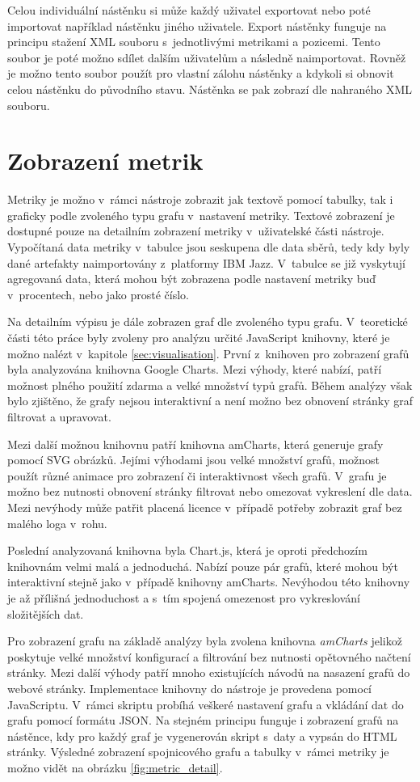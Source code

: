 \documentclass[czech,master]{diploma}
\begin{document}
Celou individuální nástěnku si může každý uživatel exportovat nebo poté importovat například nástěnku jiného uživatele. Export nástěnky funguje na principu stažení XML souboru s~jednotlivými metrikami a pozicemi. Tento soubor je poté možno sdílet dalším uživatelům a následně naimportovat. Rovněž je možno tento soubor použít pro vlastní zálohu nástěnky a kdykoli si obnovit celou nástěnku do původního stavu. Nástěnka se pak zobrazí dle nahraného XML souboru.


\section{Zobrazení metrik}
Metriky je možno v~rámci nástroje zobrazit jak textově pomocí tabulky, tak i graficky podle zvoleného typu grafu v~nastavení metriky. Textové zobrazení je dostupné pouze na detailním zobrazení metriky v~uživatelské části nástroje. Vypočítaná data metriky v~tabulce jsou seskupena dle data sběrů, tedy kdy byly dané artefakty naimportovány z~platformy IBM Jazz. V~tabulce se již vyskytují agregovaná data, která mohou být zobrazena podle nastavení metriky buď v~procentech, nebo jako prosté číslo.

Na detailním výpisu je dále zobrazen graf dle zvoleného typu grafu. V~teoretické části této práce byly zvoleny pro analýzu určité JavaScript knihovny, které je možno nalézt v~kapitole \ref{sec:visualisation}. První z~knihoven pro zobrazení grafů byla analyzována knihovna Google Charts. Mezi výhody, které nabízí, patří možnost plného použití zdarma a velké množství typů grafů. Během analýzy však bylo zjištěno, že grafy nejsou interaktivní a není možno bez obnovení stránky graf filtrovat a upravovat.

Mezi další možnou knihovnu patří knihovna amCharts, která generuje grafy pomocí SVG obrázků. Jejími výhodami jsou velké množství grafů, možnost použít různé animace pro zobrazení či interaktivnost všech grafů. V~grafu je možno bez nutnosti obnovení stránky filtrovat nebo omezovat vykreslení dle data. Mezi nevýhody může patřit placená licence v~případě potřeby zobrazit graf bez malého loga v~rohu.

Poslední analyzovaná knihovna byla Chart.js, která je oproti předchozím knihovnám velmi malá a jednoduchá. Nabízí pouze pár grafů, které mohou být interaktivní stejně jako v~případě knihovny amCharts. Nevýhodou této knihovny je až přílišná jednoduchost a s~tím spojená omezenost pro vykreslování složitějších dat.

Pro zobrazení grafu na základě analýzy byla zvolena knihovna \textit{amCharts} jelikož poskytuje velké množství konfigurací a filtrování bez nutnosti opětovného načtení stránky. Mezi další výhody patří mnoho existujících návodů na nasazení grafů do webové stránky. Implementace knihovny do nástroje je provedena pomocí JavaScriptu. V~rámci skriptu probíhá veškeré nastavení grafu a vkládání dat do grafu pomocí formátu JSON. Na stejném principu funguje i zobrazení grafů na nástěnce, kdy pro každý graf je vygenerován skript s~daty a vypsán do HTML stránky. Výsledné zobrazení spojnicového grafu a tabulky v~rámci metriky je možno vidět na obrázku \ref{fig:metric_detail}.
\end{document}
